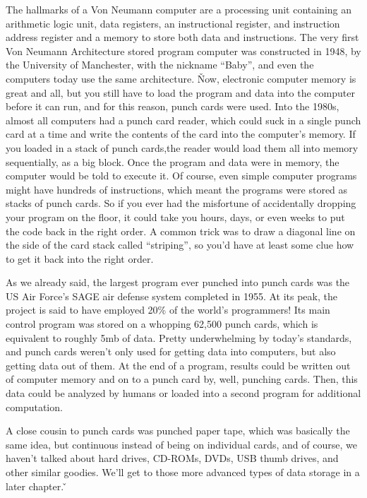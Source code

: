 The hallmarks of a Von Neumann computer are a processing unit containing an arithmetic logic unit, data registers, an
instructional register, and instruction address register and a memory to store both data and instructions. The very
first Von Neumann Architecture stored program computer was constructed in 1948, by the University of Manchester, with
the nickname ``Baby'', and even the computers today use the same architecture. \v

Now, electronic computer memory is great and all, but you still have to load the program and data into the computer
before it can run, and for this reason, punch cards were used. Into the 1980s, almost all computers had a punch card
reader, which could suck in a single punch card at a time and write the contents of the card into the computer's
memory. If you loaded in a stack of punch cards,the reader would load them all into memory sequentially, as a big
block. Once the program and data were in memory,  the computer would be told to execute it. Of course, even simple
computer programs might have hundreds of instructions, which meant the programs were stored as stacks of punch cards.
So if you ever had the misfortune of accidentally dropping your program on the floor, it could take you hours, days,
or even weeks to put the code back in the right order. A common trick was to draw a diagonal line on the side of the
card stack called ``striping'', so you'd have at least some clue how to get it back into the right order.


\be
As we already said, the largest program ever punched into punch cards was the US Air Force's SAGE air defense system
completed in 1955. At its peak, the project is said to have employed 20\% of the world's programmers! Its main
control program was stored on a whopping 62,500 punch cards, which is equivalent to roughly 5mb of data. Pretty
underwhelming by today's standards, and punch cards weren't only used for getting data into computers, but also
getting data out of them. At the end of a program, results could be written out of computer memory and on to a punch
card by, well, punching cards. Then, this data could be analyzed by humans or loaded into a second program for
additional computation.
\ee

A close cousin to punch cards was punched paper tape, which was basically the same idea, but continuous instead of
being on individual cards, and of course, we haven't talked about hard drives, CD-ROMs, DVDs, USB thumb drives, and
other similar goodies. We'll get to those more advanced types of data storage in a later chapter. \v

